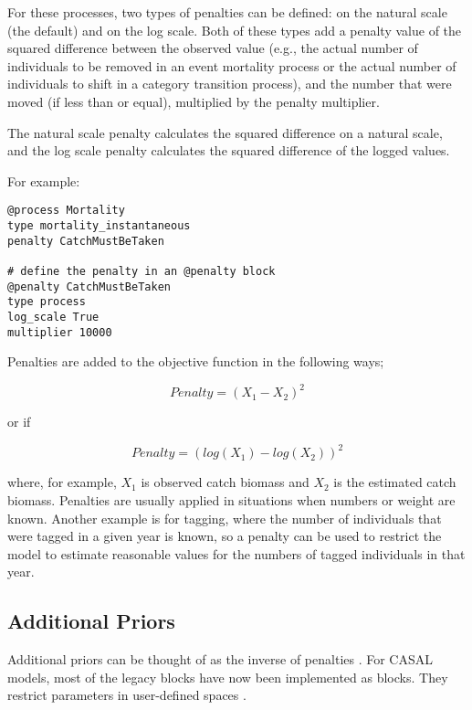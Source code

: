 For these processes, two types of penalties can be defined: on the natural scale (the default) and on the log scale. Both of these types add a penalty value of the squared difference between the observed value (e.g., the actual number of individuals to be removed in an event mortality process or the actual number of individuals to shift in a category transition process), and the number that were moved (if less than or equal), multiplied by the penalty multiplier.

The natural scale penalty calculates the squared difference on a natural scale, and the log scale penalty calculates the squared difference of the logged values.

For example:

{\small{\begin{verbatim}
@process Mortality
type mortality_instantaneous
penalty CatchMustBeTaken

# define the penalty in an @penalty block
@penalty CatchMustBeTaken
type process
log_scale True
multiplier 10000
\end{verbatim}}}

Penalties are added to the objective function in the following ways;

\begin{equation}
	Penalty = (X_1 - X_2)^2
\end{equation}

or if 

\begin{equation}
Penalty = (log(X_1) - log(X_2))^2
\end{equation}

where, for example, $X_1$ is observed catch biomass and $X_2$ is the estimated catch biomass. Penalties are usually applied in situations when numbers or weight are known. Another example is for tagging, where the number of individuals that were tagged in a given year is known, so a penalty can be used to restrict the model to estimate reasonable values for the numbers of tagged individuals in that year.

\subsection{Additional Priors\label{sec:AdditionalPriors}}

Additional priors can be thought of as the inverse of penalties . For CASAL models, most of the legacy  blocks have now been implemented as  blocks. They restrict parameters in user-defined spaces .

